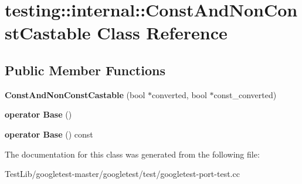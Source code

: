 \hypertarget{classtesting_1_1internal_1_1ConstAndNonConstCastable}{}\section{testing\+:\+:internal\+:\+:Const\+And\+Non\+Const\+Castable Class Reference}
\label{classtesting_1_1internal_1_1ConstAndNonConstCastable}
\subsection*{Public Member Functions}
\begin{DoxyCompactItemize}
\item 
\mbox{\label{classtesting_1_1internal_1_1ConstAndNonConstCastable_aebe0ef6897b7f805e227bb969d4ee034}} 
{\bfseries Const\+And\+Non\+Const\+Castable} (bool $\ast$converted, bool $\ast$const\+\_\+converted)
\item 
\mbox{\label{classtesting_1_1internal_1_1ConstAndNonConstCastable_aff0c372d429d76d002bb29f83f2429fa}} 
{\bfseries operator Base} ()
\item 
\mbox{\label{classtesting_1_1internal_1_1ConstAndNonConstCastable_a4e8ee8051162f1dfc1da294c71481e2f}} 
{\bfseries operator Base} () const
\end{DoxyCompactItemize}


The documentation for this class was generated from the following file\+:\begin{DoxyCompactItemize}
\item 
Test\+Lib/googletest-\/master/googletest/test/googletest-\/port-\/test.\+cc\end{DoxyCompactItemize}
